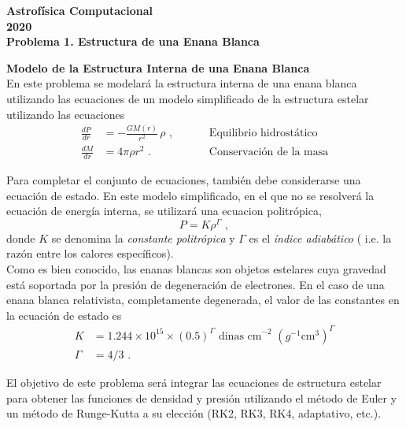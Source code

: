\documentclass[11pt]{article}
\begin{document}
\begin{center}
\large \bf Astrofísica Computacional\rm \\
2020\\
{\small Problema 1. Estructura de una Enana Blanca}
\end{center}

 {\bf Modelo de la Estructura Interna de una Enana Blanca} \\
 
En este problema se modelará la estructura interna de una enana blanca utilizando las ecuaciones de un modelo simplificado de la estructura estelar utilizando las ecuaciones
\begin{align}
\frac{dP}{dr} &= - \frac{GM(r)}{r^2}\, \rho\,\,, &\hspace{1cm}
\text{Equilibrio hidrostático}\\
\frac{dM}{dr} &= 4\pi \rho r^2\,\,. &\hspace{1cm} \text{Conservación de la masa}
\end{align}

Para completar el conjunto de ecuaciones, también debe considerarse una ecuación de estado. En este modelo simplificado, en el que no se resolverá la ecuación de energía interna, se utilizará una ecuacion politrópica,
\begin{equation}
P = K \rho^\Gamma\,\,,
\end{equation}
donde $K$ se denomina la \textit{constante politrópica} y $\Gamma$ es el \textit{índice adiabático} ( i.e. la razón entre los calores específicos).  \\

Como es bien conocido, las enanas blancas son objetos estelares cuya gravedad está soportada por la presión de degeneración de electrones. En el caso de una enana blanca relativista, completamente degenerada, el valor de las constantes en la ecuación de estado es
\begin{equation}
\begin{aligned}
K &= 1.244 \times 10^{15} \times (0.5)^\Gamma \text{ dinas cm}^{-2}\,\, (g^{-1} \mathrm{cm^3})^\Gamma\\
\Gamma &= 4/3\,\,.
\end{aligned}
\end{equation}

El objetivo de este problema será integrar las ecuaciones de estructura estelar para obtener las funciones de densidad y presión utilizando el método de Euler y un método de Runge-Kutta a su elección (RK2, RK3, RK4, adaptativo, etc.).
\end{document}
